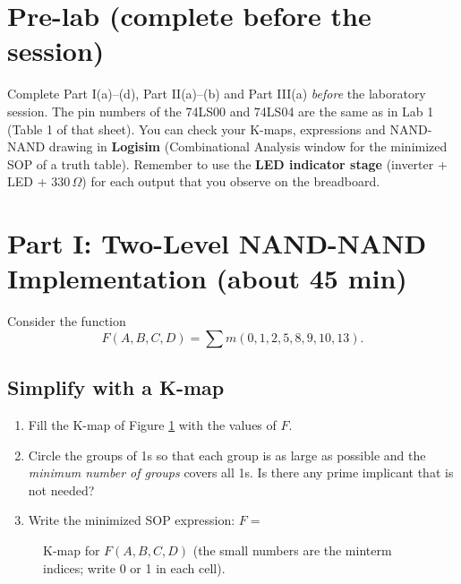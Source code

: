 \documentclass{article}
\begin{document}
\section*{Pre-lab (complete before the session)}
Complete Part I(a)--(d), Part II(a)--(b) and Part III(a) \emph{before} the laboratory session. The pin numbers of the 74LS00 and 74LS04 are the same as in Lab 1 (Table 1 of that sheet). You can check your K-maps, expressions and NAND-NAND drawing in \textbf{Logisim} (Combinational Analysis window for the minimized SOP of a truth table). Remember to use the \textbf{LED indicator stage} (inverter + LED + $330\,\Omega$) for each output that you observe on the breadboard.

\section*{Part I: Two-Level NAND-NAND Implementation (about 45 min)}

Consider the function
\[ F(A,B,C,D) = \sum m(0,1,2,5,8,9,10,13). \]

\subsection*{Simplify with a K-map}
\begin{enumerate}
    \item[(a)] Fill the K-map of Figure \ref{fig:kmap1} with the values of $F$.
    \item[(b)] Circle the groups of 1s so that each group is as large as possible and the \emph{minimum number of groups} covers all 1s. Is there any prime implicant that is not needed? \underline{\hspace{4cm}}
    \item[(c)] Write the minimized SOP expression: $F = $ \underline{\hspace{8cm}}
\end{enumerate}

\begin{figure}[H]
    \centering
    \caption{K-map for $F(A,B,C,D)$ (the small numbers are the minterm indices; write 0 or 1 in each cell).}
    \label{fig:kmap1}
\end{figure}
\end{document}
